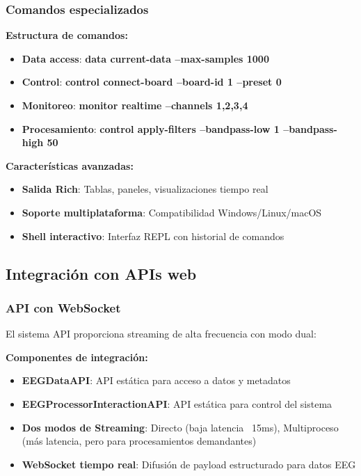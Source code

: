 \subsubsection{Comandos especializados}

\textbf{Estructura de comandos:}
\begin{itemize}
    \item \textbf{Data access}: \textbf{data current-data --max-samples 1000}
    \item \textbf{Control}: \textbf{control connect-board --board-id 1 --preset 0}
    \item \textbf{Monitoreo}: \textbf{monitor realtime --channels 1,2,3,4}
    \item \textbf{Procesamiento}: \textbf{control apply-filters --bandpass-low 1 --bandpass-high 50}
\end{itemize}

\textbf{Características avanzadas:}
\begin{itemize}
    \item \textbf{Salida Rich}: Tablas, paneles, visualizaciones tiempo real
    \item \textbf{Soporte multiplataforma}: Compatibilidad Windows/Linux/macOS
    \item \textbf{Shell interactivo}: Interfaz REPL con historial de comandos
\end{itemize}

\subsection{Integración con APIs web}
\label{subsec:integracion_api_eeg}

\subsubsection{API con WebSocket}

El sistema API proporciona streaming de alta frecuencia con modo dual:

\textbf{Componentes de integración:}
\begin{itemize}
    \item \textbf{EEGDataAPI}: API estática para acceso a datos y metadatos
    \item \textbf{EEGProcessorInteractionAPI}: API estática para control del sistema
    \item \textbf{Dos modos de Streaming}: Directo (baja latencia ~15ms), Multiproceso (más latencia, pero para procesamientos demandantes)
    \item \textbf{WebSocket tiempo real}: Difusión de payload estructurado para datos EEG
\end{itemize}

